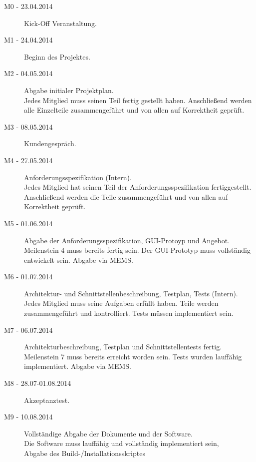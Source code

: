 \documentclass[fontsize=12pt,paper=a4,twoside]{scrartcl}
\begin{document}
\begin{description}
\item[M0 - 23.04.2014] Kick-Off Veranstaltung.

\item[M1 - 24.04.2014] Beginn des Projektes.

\item[M2 - 04.05.2014] Abgabe initialer Projektplan.\\
Jedes Mitglied muss seinen Teil fertig gestellt haben. Anschließend werden alle Einzelteile zusammengeführt und von allen auf Korrektheit geprüft.

\item[M3 - 08.05.2014] Kundengespräch.

\item[M4 - 27.05.2014] Anforderungsspezifikation (Intern). \\
Jedes Mitglied hat seinen Teil der Anforderungsspezifikation fertiggestellt. Anschließend werden die Teile zusammengeführt und von allen auf Korrektheit geprüft.

\item[M5 - 01.06.2014] Abgabe der Anforderungsspezifikation, GUI-Protoyp und Angebot. \\
Meilenstein 4 muss bereits fertig sein. Der GUI-Prototyp muss vollständig entwickelt sein. Abgabe via MEMS.

\item[M6 - 01.07.2014] Architektur- und Schnittstellenbeschreibung, Testplan, Tests (Intern).\\
Jedes Mitglied muss seine Aufgaben erfüllt haben. Teile werden zusammengeführt und kontrolliert. Tests müssen implementiert sein.

\item[M7 - 06.07.2014] Architekturbeschreibung, Testplan und Schnittstellentests fertig.\\
Meilenstein 7 muss bereits erreicht worden sein. Tests wurden lauffähig implementiert. Abgabe via MEMS.

\item[M8 - 28.07-01.08.2014] Akzeptanztest.

\item[M9 - 10.08.2014] Vollständige Abgabe der Dokumente und der Software. \\
Die Software muss lauffähig und vollständig implementiert sein,\\
Abgabe des Build-/Installationsskriptes
\end{description}
\end{document}
